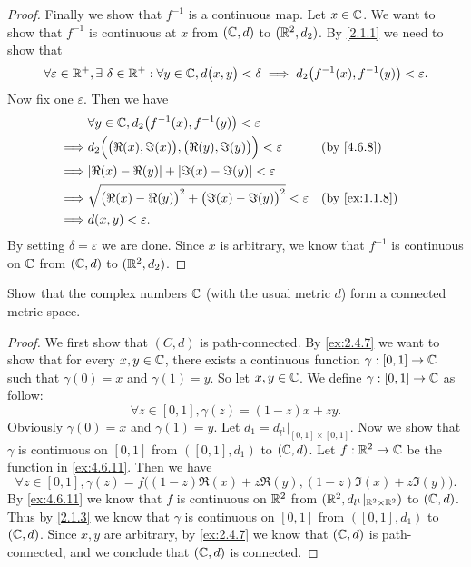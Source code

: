 \begin{proof}
  Finally we show that \(f^{-1}\) is a continuous map.
  Let \(x \in \mathbb{C}\).
  We want to show that \(f^{-1}\) is continuous at \(x\) from \((\mathbb{C}, d)\) to \((\mathbb{R}^2, d_2)\).
  By \cref{2.1.1} we need to show that
  \[
    \forall \varepsilon \in \mathbb{R}^+, \exists\ \delta \in \mathbb{R}^+ : \forall y \in \mathbb{C}, d\big(x, y\big) < \delta \implies d_2\big(f^{-1}(x), f^{-1}(y)\big) < \varepsilon.
  \]
  Now fix one \(\varepsilon\).
  Then we have
  \begin{align*}
             & \forall y \in \C, d_2\big(f^{-1}(x), f^{-1}(y)\big) < \varepsilon                                               \\
    \implies & d_2\Big(\big(\Re(x), \Im(x)\big), \big(\Re(y), \Im(y)\big)\Big) < \varepsilon  &  & \text{(by \cref{4.6.8})}    \\
    \implies & \abs{\Re(x) - \Re(y)} + \abs{\Im(x) - \Im(y)} < \varepsilon                                                     \\
    \implies & \sqrt{\big(\Re(x) - \Re(y)\big)^2 + \big(\Im(x) - \Im(y)\big)^2} < \varepsilon &  & \text{(by \cref{ex:1.1.8})} \\
    \implies & d(x, y) < \varepsilon.
  \end{align*}
  By setting \(\delta = \varepsilon\) we are done.
  Since \(x\) is arbitrary, we know that \(f^{-1}\) is continuous on \(\mathbb{C}\) from \((\mathbb{C}, d)\) to \((\mathbb{R}^2, d_2)\).
\end{proof}

\begin{ex}\label{ex:4.6.12}
  Show that the complex numbers \(\mathbb{C}\) (with the usual metric \(d\)) form a connected metric space.
\end{ex}

\begin{proof}
  We first show that \((C, d)\) is path-connected.
  By \cref{ex:2.4.7} we want to show that for every \(x, y \in \mathbb{C}\), there exists a continuous function \(\gamma : [0, 1] \to \mathbb{C}\) such that \(\gamma(0) = x\) and \(\gamma(1) = y\).
  So let \(x, y \in \mathbb{C}\).
  We define \(\gamma : [0, 1] \to \mathbb{C}\) as follow:
  \[
    \forall z \in [0, 1], \gamma(z) = (1 - z)x + zy.
  \]
  Obviously \(\gamma(0) = x\) and \(\gamma(1) = y\).
  Let \(d_1 = d_{l^1}|_{[0, 1] \times [0, 1]}\).
  Now we show that \(\gamma\) is continuous on \([0, 1]\) from \(([0, 1], d_1)\) to \((\mathbb{C}, d)\).
  Let \(f : \mathbb{R}^2 \to \mathbb{C}\) be the function in \cref{ex:4.6.11}.
  Then we have
  \[
    \forall z \in [0, 1], \gamma(z) = f\big((1 - z) \Re(x) + z \Re(y), (1 - z) \Im(x) + z \Im(y)\big).
  \]
  By \cref{ex:4.6.11} we know that \(f\) is continuous on \(\mathbb{R}^2\) from \((\mathbb{R}^2, d_{l^1}|_{\mathbb{R}^2 \times \mathbb{R}^2})\) to \((\mathbb{C}, d)\).
  Thus by \cref{2.1.3} we know that \(\gamma\) is continuous on \([0, 1]\) from \(([0, 1], d_1)\) to \((\mathbb{C}, d)\).
  Since \(x, y\) are arbitrary, by \cref{ex:2.4.7} we know that \((\mathbb{C}, d)\) is path-connected, and we conclude that \((\mathbb{C}, d)\) is connected.
\end{proof}

